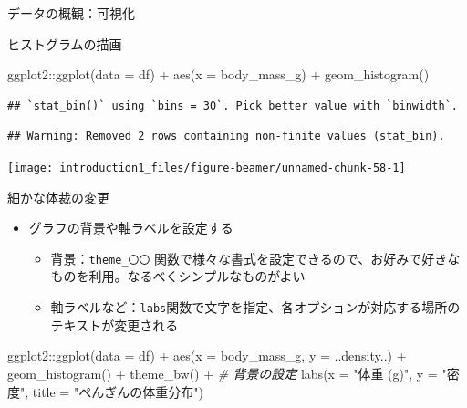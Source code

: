 \documentclass[
  ignorenonframetext,
]{beamer}
\newenvironment{Shaded}{\begin{snugshade}}{\end{snugshade}}
\newcommand{\AttributeTok}[1]{\textcolor[rgb]{0.77,0.63,0.00}{#1}}
\newcommand{\CommentTok}[1]{\textcolor[rgb]{0.56,0.35,0.01}{\textit{#1}}}
\newcommand{\FunctionTok}[1]{\textcolor[rgb]{0.00,0.00,0.00}{#1}}
\newcommand{\NormalTok}[1]{#1}
\newcommand{\SpecialCharTok}[1]{\textcolor[rgb]{0.00,0.00,0.00}{#1}}
\newcommand{\StringTok}[1]{\textcolor[rgb]{0.31,0.60,0.02}{#1}}
\providecommand{\tightlist}{%
  \setlength{\itemsep}{0pt}\setlength{\parskip}{0pt}}
\begin{document}
\begin{frame}[fragile]{データの概観：可視化}
\begin{block}{ヒストグラムの描画}
\protect\hypertarget{ux30d2ux30b9ux30c8ux30b0ux30e9ux30e0ux306eux63cfux753b}{}
\begin{Shaded}
\begin{Highlighting}[]
\NormalTok{ggplot2}\SpecialCharTok{::}\FunctionTok{ggplot}\NormalTok{(}\AttributeTok{data =}\NormalTok{ df) }\SpecialCharTok{+}
  \FunctionTok{aes}\NormalTok{(}\AttributeTok{x =}\NormalTok{ body\_mass\_g) }\SpecialCharTok{+}
  \FunctionTok{geom\_histogram}\NormalTok{()}
\end{Highlighting}
\end{Shaded}

\begin{verbatim}
## `stat_bin()` using `bins = 30`. Pick better value with `binwidth`.
\end{verbatim}

\begin{verbatim}
## Warning: Removed 2 rows containing non-finite values (stat_bin).
\end{verbatim}

\begin{center}\texttt{[image: introduction1\_files/figure-beamer/unnamed-chunk-58-1]} \end{center}
\end{block}

\begin{block}{細かな体裁の変更}
\protect\hypertarget{ux7d30ux304bux306aux4f53ux88c1ux306eux5909ux66f4}{}
\begin{itemize}
\tightlist
\item
  グラフの背景や軸ラベルを設定する

  \begin{itemize}
  \tightlist
  \item
    背景：\texttt{theme\_〇〇}
    関数で様々な書式を設定できるので、お好みで好きなものを利用。なるべくシンプルなものがよい
  \item
    軸ラベルなど：\texttt{labs}関数で文字を指定、各オプションが対応する場所のテキストが変更される
  \end{itemize}
\end{itemize}

\begin{Shaded}
\begin{Highlighting}[]
\NormalTok{ggplot2}\SpecialCharTok{::}\FunctionTok{ggplot}\NormalTok{(}\AttributeTok{data =}\NormalTok{ df) }\SpecialCharTok{+}
  \FunctionTok{aes}\NormalTok{(}\AttributeTok{x =}\NormalTok{ body\_mass\_g, }\AttributeTok{y =}\NormalTok{ ..density..) }\SpecialCharTok{+}
  \FunctionTok{geom\_histogram}\NormalTok{() }\SpecialCharTok{+}
  \FunctionTok{theme\_bw}\NormalTok{() }\SpecialCharTok{+} \CommentTok{\# 背景の設定}
  \FunctionTok{labs}\NormalTok{(}\AttributeTok{x =} \StringTok{"体重 (g)"}\NormalTok{, }\AttributeTok{y =} \StringTok{"密度"}\NormalTok{, }\AttributeTok{title =} \StringTok{"ぺんぎんの体重分布"}\NormalTok{)}
\end{Highlighting}
\end{Shaded}


\end{block}
\end{frame}
\end{document}
